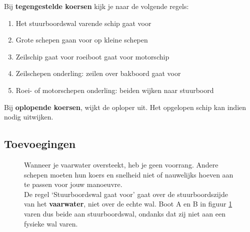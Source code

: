 Bij \textbf{tegengestelde koersen} kijk je naar de volgende regels:
\vspace*{-0.15cm}
\begin{enumerate}
	\item Het stuurboordswal varende schip gaat voor
	\item Grote schepen gaan voor op kleine schepen
	\item Zeilschip gaat voor roeiboot gaat voor motorschip
	\item Zeilschepen onderling: zeilen over bakboord gaat voor
	\item Roei- of motorschepen onderling: beiden wijken naar stuurboord
\end{enumerate}

Bij \textbf{oplopende koersen}, wijkt de oploper uit. Het opgelopen schip kan indien nodig uitwijken.

\subsection{Toevoegingen}
\begin{figure}[H]
	\centering
	\begin{minipage}[t]{0.65\textwidth}
		Wanneer je vaarwater oversteekt, heb je geen voorrang. Andere schepen moeten hun koers en snelheid niet of nauwelijks hoeven aan te passen voor jouw manoeuvre. \\
		
		
		De regel `Stuurboordswal gaat voor' gaat over de stuurboordszijde van het \textbf{vaarwater}, niet over de echte wal. Boot A en B in figuur \ref{pic:SBwal} varen dus beide aan stuurboordswal, ondanks dat zij niet aan een fysieke wal varen.
	\end{minipage}
	\hfill
	\begin{minipage}[t]{0.30\textwidth}
		\caption{}
		\label{pic:SBwal}
	\end{minipage}
\end{figure}


